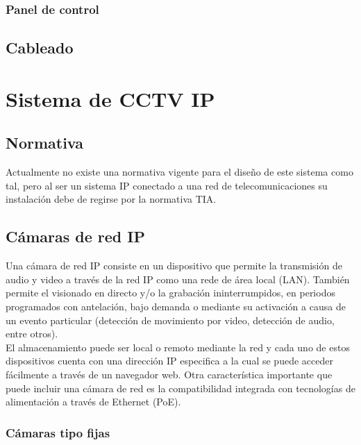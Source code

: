 \subsubsection{Panel de control}




\subsection{Cableado}


\newpage


\section{Sistema de CCTV IP}

\subsection{Normativa}

Actualmente no existe una normativa vigente para el diseño de este sistema como tal, pero al ser un sistema IP conectado a una red de telecomunicaciones su instalación debe de regirse por la normativa TIA.


\subsection{Cámaras de red IP }


Una cámara de red IP consiste en un dispositivo que permite la transmisión de audio y video a través de la red IP como una rede de área local (LAN). También permite el visionado en directo y/o la grabación ininterrumpidos, en periodos programados con antelación, bajo demanda o mediante su activación a causa de un evento particular (detección de movimiento por video, detección de audio, entre otros). \cite{Axis} \\

El almacenamiento puede ser local o remoto mediante la red y cada uno de estos dispositivos cuenta con una dirección IP especifica a la cual se puede acceder fácilmente a través de un navegador web. Otra característica importante que puede incluir una cámara de red es la compatibilidad integrada con tecnologías de alimentación a través de Ethernet (PoE). \cite{Axis}


\subsubsection{Cámaras tipo fijas}

